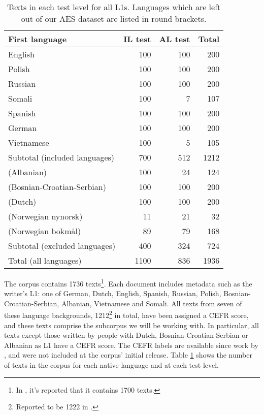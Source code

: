 \begin{table}
  \centering
  \begin{tabular}{lrrr}
    \toprule
    First language             & IL test & AL test & Total \\
    \midrule
    English                    &     100 &     100 &   200 \\
    Polish                     &     100 &     100 &   200 \\
    Russian                    &     100 &     100 &   200 \\
    Somali                     &     100 &       7 &   107 \\
    Spanish                    &     100 &     100 &   200 \\
    German                     &     100 &     100 &   200 \\
    Vietnamese                 &     100 &       5 &   105 \\
    \midrule
    Subtotal (included languages) &  700 &     512 &  1212 \\ \addlinespace
    \midrule
    (Albanian)                 &     100 &      24 &   124 \\
    (Bosnian-Croatian-Serbian) &     100 &     100 &   200 \\
    (Dutch)                    &     100 &     100 &   200 \\
    (Norwegian nynorsk)        &      11 &      21 &    32 \\
    (Norwegian bokmål)         &      89 &      79 &   168 \\
    \midrule
    Subtotal (excluded languages) &  400 &     324 &   724 \\ \addlinespace
    \midrule
    Total (all languages)      &    1100 &     836 &  1936 \\
    \bottomrule
  \end{tabular}
  \caption[Distributions of first languages for each test level in ASK]{
    Texts in each test level for all \acp{L1}. Languages which are
    left out of our AES dataset are listed in round brackets.
  }
  \label{tab:l1-and-testlevel}
\end{table}

The corpus contains 1736 texts\footnote{In
\textcite{carlsen2012proficiency,malmasi15,malmasi17}, it's reported that it
contains 1700 texts.}. Each document includes metadata such as the writer's
L1: one of German, Dutch, English, Spanish, Russian, Polish,
Bosnian-Croatian-Serbian, Albanian, Vietnamese and Somali. All texts from
seven of these language backgrounds, 1212\footnote{Reported to be 1222 in
\textcite{carlsen2012proficiency}.} in total, have been assigned a \ac{CEFR}
score, and these texts comprise the subcorpus we will be working with. In
particular, all texts except those written by people with Dutch,
Bosnian-Croatian-Serbian or Albanian as L1 have a CEFR score. The CEFR labels
are available since work by \textcite{carlsen2012proficiency}, and were not
included at the corpus' initial release. Table \ref{tab:l1-and-testlevel}
shows the number of texts in the corpus for each native language and at each
test level.

